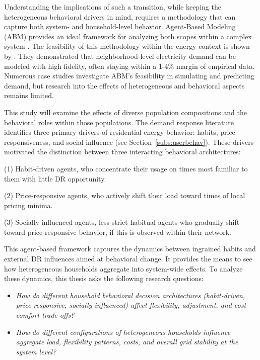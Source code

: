 \documentclass[11pt, a4paper]{article}
\begin{document}
Understanding the implications of such a transition, while keeping the heterogeneous behavioral drivers in mind, requires a methodology that can capture both system- and household-level behavior. Agent-Based Modeling (ABM) provides an ideal framework for analyzing both scopes within a complex system \autocite{wilensky_introduction_2015}. The feasibility of this methodology within the energy context is shown by \textcite{williams_residential_2025}. They demonstrated that neighborhood-level electricity demand can be modeled with high fidelity, often staying within a 1-4\% margin of empirical data. Numerous case studies investigate ABM's feasibility in simulating and predicting demand, but research into the effects of heterogeneous and behavioral aspects remains limited.

\medskip

This study will examine the effects of diverse population compositions and the behavioral roles within those populations. The demand response literature identifies three primary drivers of residential energy behavior: habits, price responsiveness, and social influence (see Section~\ref{subs:userbehav}). These drivers motivated the distinction between three interacting behavioral architectures:

(1) Habit-driven agents, who concentrate their usage on times most familiar to them with little DR opportunity. 

(2) Price-responsive agents, who actively shift their load toward times of local pricing minima. 

(3) Socially-influenced agents, less strict habitual agents who gradually shift toward price-responsive behavior, if this is observed within their network.  

\medskip

This agent-based framework captures the dynamics between ingrained habits and external DR influences aimed at behavioral change. It provides the means to see how heterogeneous households aggregate into system-wide effects. To analyze these dynamics, this thesis asks the following research questions:

\begin{itemize}
    \item[RQ1] \emph{How do different household behavioral decision
architectures (habit-driven, price-responsive,
socially-influenced) affect flexibility, adjustment, and cost-comfort
trade-offs?}
    \item[RQ2] \emph{How do different configurations of heterogeneous households influence aggregate load, flexibility patterns, costs, and overall grid stability at the system level?}
\end{itemize}
\end{document}
